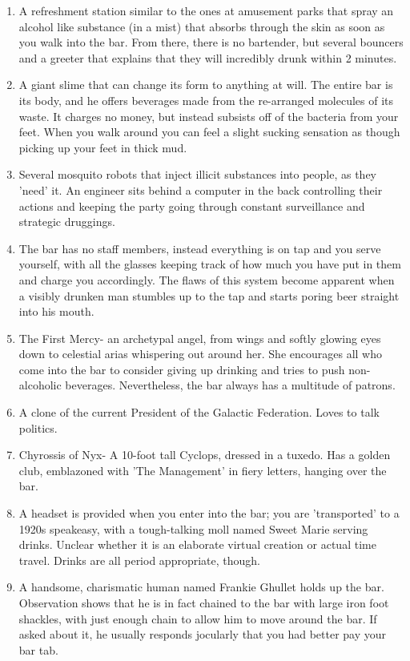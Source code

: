\documentclass{article}
\begin{document}
\begin{enumerate}
	\item A refreshment station similar to the ones at amusement parks that spray an alcohol like substance (in a mist) that absorbs through the skin as soon as you walk into the bar. From there, there is no bartender, but several bouncers and a greeter that explains that they will incredibly drunk within 2 minutes.
	\item A giant slime that can change its form to anything at will. The entire bar is its body, and he offers beverages made from the re-arranged molecules of its waste. It charges no money, but instead subsists off of the bacteria from your feet. When you walk around you can feel a slight sucking sensation as though picking up your feet in thick mud.
	\item Several mosquito robots that inject illicit substances into people, as they 'need' it. An engineer sits behind a computer in the back controlling their actions and keeping the party going through constant surveillance and strategic druggings.
	\item The bar has no staff members, instead everything is on tap and you serve yourself, with all the glasses keeping track of how much you have put in them and charge you accordingly. The flaws of this system become apparent when a visibly drunken man stumbles up to the tap and starts poring beer straight into his mouth.
	\item The First Mercy- an archetypal angel, from wings and softly glowing eyes down to celestial arias whispering out around her. She encourages all who come into the bar to consider giving up drinking and tries to push non-alcoholic beverages. Nevertheless, the bar always has a multitude of patrons.
	\item A clone of the current President of the Galactic Federation. Loves to talk politics.
	\item Chyrossis of Nyx- A 10-foot tall Cyclops, dressed in a tuxedo. Has a golden club, emblazoned with 'The Management' in fiery letters, hanging over the bar.
	\item A headset is provided when you enter into the bar; you are 'transported' to a 1920s speakeasy, with a tough-talking moll named Sweet Marie serving drinks. Unclear whether it is an elaborate virtual creation or actual time travel. Drinks are all period appropriate, though.
	\item A handsome, charismatic human named Frankie Ghullet holds up the bar. Observation shows that he is in fact chained to the bar with large iron foot shackles, with just enough chain to allow him to move around the bar. If asked about it, he usually responds jocularly that you had better pay your bar tab.

\end{enumerate}
\end{document}
